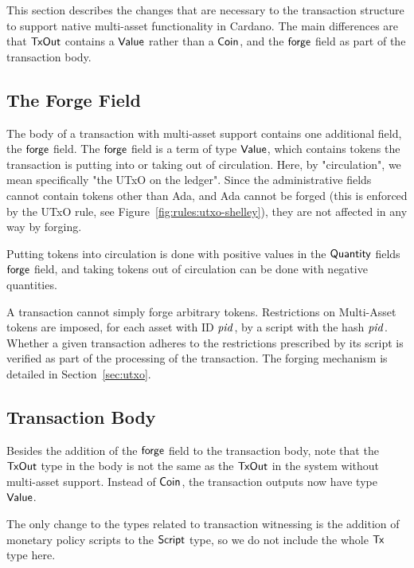 This section describes the changes that are necessary to the
transaction structure to support native multi-asset functionality in
Cardano. The main differences are that $\mathsf{TxOut}$ contains a $\mathsf{Value}$
rather than a $\mathsf{Coin}$, and the $\mathsf{forge}$ field as part of the
transaction body.

\subsection*{The Forge Field}

The body of a transaction with multi-asset support contains one additional
field, the $\mathsf{forge}$ field.
The $\mathsf{forge}$ field is a term of type $\mathsf{Value}$, which contains
tokens the transaction is putting into or taking out of
circulation. Here, by "circulation", we mean specifically "the UTxO on the
ledger". Since the administrative fields cannot contain tokens other than Ada,
and Ada cannot be forged (this is enforced by the UTxO rule, see Figure~\ref{fig:rules:utxo-shelley}),
they are not affected in any way by forging.

Putting tokens into circulation is done with positive values in the $\mathsf{Quantity}$
fields $\mathsf{forge}$ field, and taking tokens out of circulation can be done
with negative quantities.

A transaction cannot simply forge arbitrary tokens. Restrictions on
Multi-Asset tokens are imposed, for each asset with ID $\mathit{pid}$, by a script
with the hash $\mathit{pid}$. Whether a given transaction adheres to the restrictions
prescribed by its script is verified as part of the processing of the transaction.
The forging mechanism is detailed in Section~\ref{sec:utxo}.

\subsection*{Transaction Body}

Besides the addition of the $\mathsf{forge}$ field to the transaction body,
note that the $\mathsf{TxOut}$ type in the body is not the same as
the $\mathsf{TxOut}$ in the system without multi-asset support. Instead of
$\mathsf{Coin}$, the transaction outputs now have type $\mathsf{Value}$.

The only change to the types related to transaction witnessing is the addition
of monetary policy scripts to the $\mathsf{Script}$ type, so we do not include the whole $\mathsf{Tx}$ type here.
